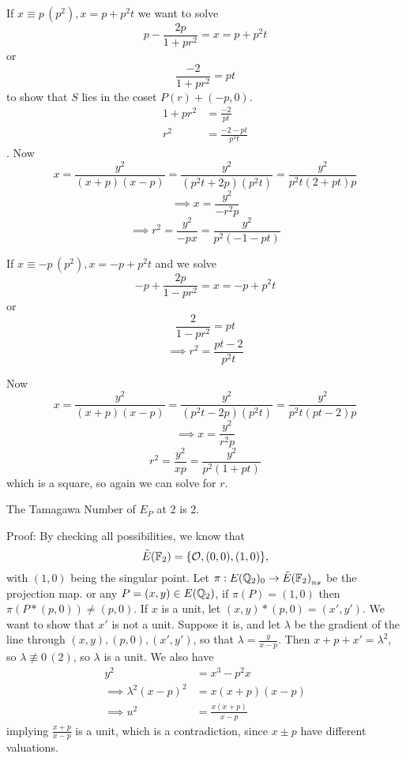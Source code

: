 \documentclass[12pt, a4paper]{amsart}
\begin{document}
If $x \equiv p \, (p^2), x = p + p^2t$ we want to solve
\[p - \frac{2p}{1+pr^2} = x = p + p^2t \] or
\[ \frac{-2}{1+pr^2} = pt\]
to show that $S$ lies in the coset $P(r)+(-p,0)$.
\begin{equation*}
  \begin{split}
    1+pr^2 &= \frac{-2}{pt} \\
    r^2 &= \frac{-2-pt}{p^2t}
  \end{split}
\end{equation*}.
Now
\[ x = \frac{y^2}{(x+p)(x-p)} = \frac{y^2}{(p^2t+2p)(p^2t)}
= \frac{y^2}{p^2t(2+pt)p}\]
\[ \implies x = \frac{y^2}{-r^2 p}\]
\[ \implies r^2 = \frac{y^2}{-px} = \frac{y^2}{p^2(-1-pt)}\]


If $x \equiv -p \, (p^2), x = -p + p^2t$ and we solve
\[ -p + \frac{2p}{1-pr^2} = x = -p + p^2t\] or
\[ \frac{2}{1-pr^2} = pt\]
\[ \implies r^2 = \frac{pt - 2}{p^2t}\]

Now
\[ x = \frac{y^2}{(x+p)(x-p)} = \frac{y^2}{(p^2t-2p)(p^2t)}
= \frac{y^2}{p^2t(pt-2)p}\]
\[\implies x = \frac{y^2}{r^2p}\]
\[ r^2 = \frac{y^2}{xp} = \frac{y^2}{p^2(1+pt)}\]
which is a square, so again we can solve for $r$.

\begin{thm}
  The Tamagawa Number of $E_P$ at 2 is 2.
\end{thm}
Proof: By checking all possibilities, we know that
\[{\tilde{E}(\mathbb{F}_2)} = \{{\mathcal O}, (0,0), (1,0)\},\]
with $(1,0)$ being the singular point. Let $\pi : E({\mathbb Q}_2)_0 \rightarrow
{\tilde{E}(\mathbb{F}_2)}_{ns}$ be the projection map. 
or any $P = (x,y) \in E({\mathbb Q}_2)$, if $\pi(P) = (1,0)$ then $\pi(P * (p,0)) \neq (p,0)$.
If $x$ is a unit, let $(x,y) * (p,0) = (x',y')$. We want to show that $x'$ is
not a unit. Suppose it is, and let $\lambda$ be the gradient of the line through
$(x,y), (p,0), (x',y')$, so that $\lambda = \frac{y}{x-p}$.
Then $x + p + x' = \lambda^2$, so $\lambda \not\equiv 0 \, (2)$, so $\lambda$ is
a unit. We also have
\[
  \begin{split}
     y^2 &= x^3 - p^2x \\
     \implies \lambda^2(x-p)^2 &= x (x+p) (x-p) \\
     \implies u^2 &= \frac{x (x+p)}{x-p} 
   \end{split}
\]
implying $\frac{x+p}{x-p}$ is a unit, which is a contradiction, since
$x \pm p$ have different valuations.

\printbibliography
\end{document}
